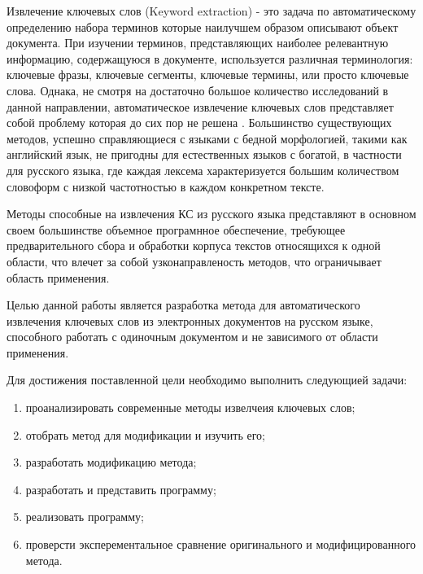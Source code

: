 Извлечение ключевых слов (Keyword extraction) - это задача по автоматическому определению набора терминов которые наилучшем образом описывают объект документа.
При изучении терминов, представляющих наиболее релевантную информацию, содержащуюся в документе, используется различная терминология: ключевые фразы, ключевые сегменты, ключевые термины, или просто ключевые слова.
Однака, не смотря на достаточно большое количество исследований в данной направлении, автоматическое извлечение ключевых слов представляет собой проблему которая до сих пор не решена \cite{9}. 
Большинство существующих методов, успешно справляющиеся с языками с бедной морфологией, такими как английский язык, не пригодны для естественных языков с богатой, в частности для русского языка, где каждая лексема характеризуется большим количеством словоформ с низкой частотностью в каждом конкретном тексте.

Методы способные на извлечения КС из русского языка представляют в основном своем большинстве объемное програмнное обеспечение, требующее предварительного сбора и обработки корпуса текстов относящихся к одной области, что влечет за собой узконаправленость методов, что ограничывает область применения.

Целью данной работы является разработка метода для автоматического извлечения ключевых слов из электронных документов на русском языке, способного работать с одиночным документом и не зависимого от области применения.

Для достижения поставленной цели необходимо выполнить следующией задачи:
\begin{enumerate}
	\item проанализировать современные методы извелчеия ключевых слов;
	\item отобрать метод для модификации и изучить его;
	\item разработать модификацию метода;
	\item разработать и представить программу;
	\item реализовать программу;
	\item проверсти эксперементальное сравнение оригинального и модифицированного метода.
\end{enumerate}